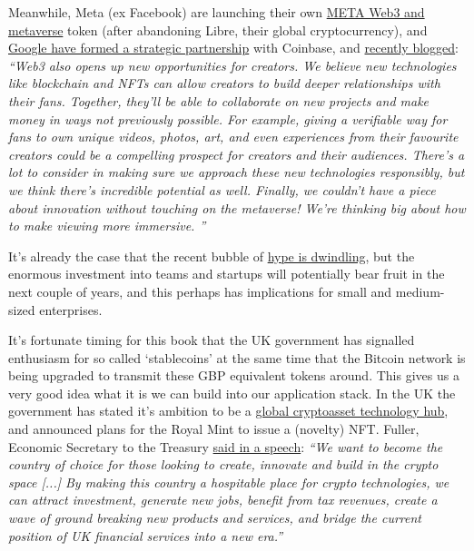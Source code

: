 Meanwhile, Meta (ex Facebook) are launching their own \href{https://archive.ph/coyp2}{META Web3 and metaverse} token (after abandoning Libre, their global cryptocurrency), and \href{https://www.coinbase.com/blog/announcing-coinbase-google-cloud}{Google have formed a strategic partnership} with Coinbase, and \href{https://blog.youtube/inside-youtube/innovations-for-2022-at-youtube/}{recently blogged}: \textit{``Web3 also opens up new opportunities for creators. We believe new technologies like blockchain and NFTs can allow creators to build deeper relationships with their fans. Together, they'll be able to collaborate on new projects and make money in ways not previously possible. For example, giving a verifiable way for fans to own unique videos, photos, art, and even experiences from their favourite creators could be a compelling prospect for creators and their audiences. There's a lot to consider in making sure we approach these new technologies responsibly, but we think there's incredible potential as well. Finally, we couldn't have a piece about innovation without touching on the metaverse! We're thinking big about how to make viewing more immersive. ''}\par
It's already the case that the recent bubble of \href{https://www.forbes.com/sites/paultassi/2022/03/10/interest-in-nfts-and-the-metaverse-is-falling-fast/?}{hype is dwindling}, but the enormous investment into teams and startups will potentially bear fruit in the next couple of years, and this perhaps has implications for small and medium-sized enterprises.\par
It's fortunate timing for this book that the UK government has signalled enthusiasm for so called `stablecoins' at the same time that the Bitcoin network is being upgraded to transmit these GBP equivalent tokens around. This gives us a very good idea what it is we can build into our application stack. In the UK the government has stated it's ambition to be a \href{https://www.gov.uk/government/news/government-sets-out-plan-to-make-uk-a-global-cryptoasset-technology-hub}{global cryptoasset technology hub}, and announced plans for the Royal Mint to issue a (novelty) NFT. Fuller, Economic Secretary to the Treasury \href{https://drive.google.com/file/d/19ZYKLeT-ds3TueTpqSM22MUqB4gmN_Pl/view}{said in a speech}: \textit{``We want to become the country of choice for those looking to create, innovate and build in the crypto space [...] By making this country a hospitable place for crypto technologies, we can attract investment, generate new jobs, benefit from tax revenues, create a wave of ground breaking new products and services, and bridge the current position of UK financial services into a new era.''}\par
